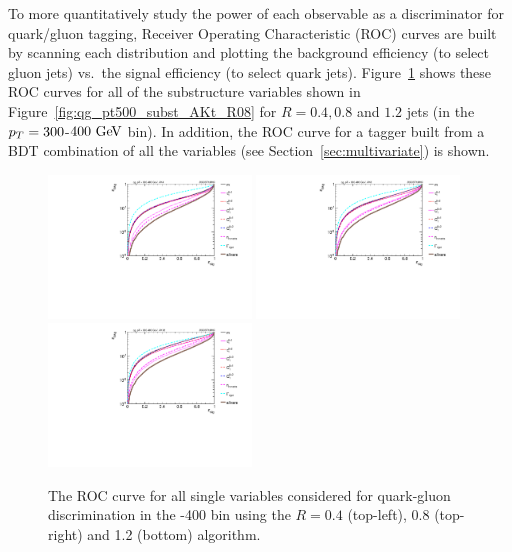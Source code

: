 To more quantitatively study the power of each observable as a
discriminator for quark/gluon tagging, Receiver Operating Characteristic (ROC) curves are built by scanning each distribution
and plotting the background efficiency (to select gluon jets) vs.~the signal efficiency (to select quark jets). 
Figure~\ref{fig:qg_pt300_single} shows these ROC curves for all of the
substructure variables shown in 
Figure~\ref{fig:qg_pt500_subst_AKt_R08} for $R=0.4, 0.8$ and $1.2$ jets (in the $p_T=300$-$400\GeV$
bin). In addition, the ROC curve for a tagger built from a BDT
combination of all the variables (see Section~\ref{sec:multivariate}) is shown.
%
\begin{figure}
\centering
\includegraphics[width=0.48\textwidth]{./Figures/QGTagging/pT300/AKtR04/Rocs_1D_single.pdf}
\includegraphics[width=0.48\textwidth]{./Figures/QGTagging/pT300/AKtR08/Rocs_1D_single.pdf}
\includegraphics[width=0.48\textwidth]{./Figures/QGTagging/pT300/AKtR12/Rocs_1D_single.pdf}
\caption{The ROC curve for all single variables considered for
  quark-gluon discrimination in the -400 \GeV bin using the
  \antikt $R=0.4$ (top-left), 0.8 (top-right) and 1.2 (bottom) algorithm.
}
\label{fig:qg_pt300_single}
\end{figure}
